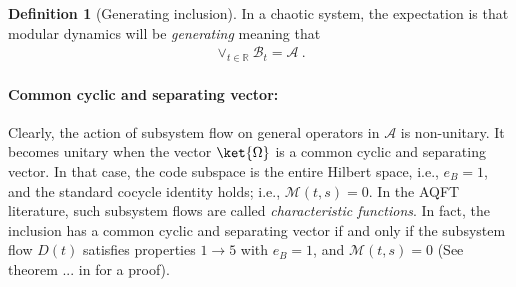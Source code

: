 \documentclass[a4paper,11pt]{article}
\theoremstyle{definition}
\newtheorem{definition}{Definition}[section]
\newcommand{\mA}{\mathcal{A}}
\newcommand{\mB}{\mathcal{B}}
\newcommand{\mM}{\mathcal{M}}
\begin{document}




\begin{definition}[Generating inclusion]
In a chaotic system, the expectation is that modular dynamics will be {\it generating} meaning that 
\begin{align}\label{geneating}
    \vee_{t\in \mathbb{R}}\mB_t=\mA\ .
\end{align}
\end{definition}


\paragraph{Common cyclic and separating vector:} Clearly, the action of subsystem flow on general operators in $\mA$ is non-unitary. It becomes unitary when the vector $\ket{\Omega}$ is a common cyclic and separating vector. In that case, the code subspace is the entire Hilbert space, i.e., $e_B=1$, and the standard cocycle identity holds; i.e., $\mM(t,s)=0$. In the AQFT literature, such subsystem flows are called {\it characteristic functions}. In fact, the inclusion has a common cyclic and separating vector if and only if the subsystem flow $D(t)$ satisfies properties $1\to 5$ with $e_B=1$, and $\mM(t,s)=0$ (See theorem ... in \cite{} for a proof). 
\end{document}
